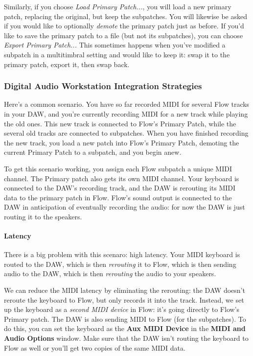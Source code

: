 \documentclass{article}
\begin{document}
Similarly, if you choose {\it Load Primary Patch...}, you will load a new primary patch, replacing the original, but keep the subpatches.  You will likewise be asked if you would like to optionally {\it demote} the primary patch just as before.  If you'd like to save the primary patch to a file (but not its subpatches), you can choose {\it Export Primary Patch...}  This sometimes happens when you've modified a subpatch in a multitimbral setting and would like to keep it: swap it to the primary patch, export it, then swap back.

\subsubsection{Digital Audio Workstation Integration Strategies}

Here's a common scenario.  You have so far recorded MIDI for several Flow tracks in your DAW, and you're currently recording MIDI for a new track while playing the old ones.  This new track is connected to Flow's Primary Patch, while the several old tracks are connected to subpatches.  When you have finished recording the new track, you load a new patch into Flow's Primary Patch, demoting the current Primary Patch to a subpatch, and you begin anew.

To get this scenario working, you assign each Flow subpatch a unique MIDI channel.  The Primary patch also gets its own MIDI channel.  Your keyboard is connected to the DAW's recording track, and the DAW is rerouting its MIDI data to the primary patch in Flow.  Flow's sound output is connected to the DAW in anticipation of eventually recording the audio: for now the DAW is just routing it to the speakers.

\paragraph{Latency} There is a big problem with this scenaro: high latency.  Your MIDI keyboard is routed to the DAW, which is then {\it rerouting} it to Flow, which is then sending audio to the DAW, which is then {\it rerouting} the audio to your speakers.

We can reduce the MIDI latency by eliminating the rerouting: the DAW doesn't reroute the keyboard to Flow, but only records it into the track.  Instead, we set up the keyboard as a {\it second MIDI device} in Flow: it's going directly to Flow's Primary patch.  The DAW is also sending MIDI to Flow (for the subpatches).  To do this, you can set the keyboard as the {\bf Aux MIDI Device} in the {\bf MIDI and Audio Options} window.  Make sure that the DAW isn't routing the keyboard to Flow as well or you'll get two copies of the same MIDI data.
\end{document}
